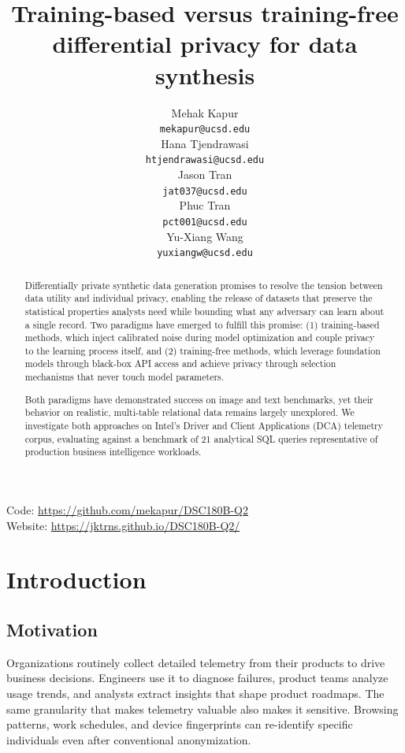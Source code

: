 \documentclass[12pt,letterpaper]{article}
\title{Training-based versus training-free \\ differential privacy for data synthesis}
\author{Mehak Kapur \\
  {\tt mekapur@ucsd.edu} \\\And
  Hana Tjendrawasi  \\
  {\tt htjendrawasi@ucsd.edu} \\\And
  Jason Tran \\
  {\tt jat037@ucsd.edu} \\\And
  Phuc Tran \\
  {\tt pct001@ucsd.edu} \\\And
  Yu-Xiang Wang \\
  {\tt yuxiangw@ucsd.edu} \\}
\renewcommand{\_}{\textunderscore\allowbreak}
\begin{document}
\maketitle

\begin{abstract}
Differentially private synthetic data generation promises to resolve the tension between data utility and individual privacy, enabling the release of datasets that preserve the statistical properties analysts need while bounding what any adversary can learn about a single record. Two paradigms have emerged to fulfill this promise: (1) training-based methods, which inject calibrated noise during model optimization and couple privacy to the learning process itself, and (2) training-free methods, which leverage foundation models through black-box API access and achieve privacy through selection mechanisms that never touch model parameters.

Both paradigms have demonstrated success on image and text benchmarks, yet their behavior on realistic, multi-table relational data remains largely unexplored. We investigate both approaches on Intel's Driver and Client Applications (DCA) telemetry corpus, evaluating against a benchmark of 21 analytical SQL queries representative of production business intelligence workloads.
\end{abstract}

\begin{center}
Code: \url{https://github.com/mekapur/DSC180B-Q2} \\
Website: \url{https://jktrns.github.io/DSC180B-Q2/}
\end{center}

\clearpage
\maketoc
\clearpage

\section{Introduction}

\subsection{Motivation}

Organizations routinely collect detailed telemetry from their products to drive business decisions. Engineers use it to diagnose failures, product teams analyze usage trends, and analysts extract insights that shape product roadmaps. The same granularity that makes telemetry valuable also makes it sensitive. Browsing patterns, work schedules, and device fingerprints can re-identify specific individuals even after conventional anonymization.
\end{document}
